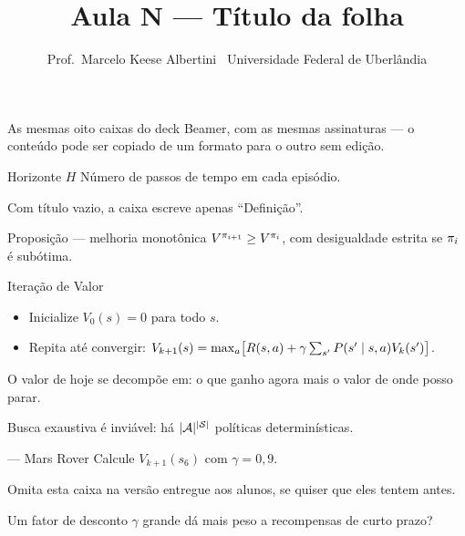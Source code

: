 \documentclass[a4paper, 11pt]{extarticle}
\title{Aula N — Título da folha}
\author{Prof.\ Marcelo Keese Albertini \textbullet\ Universidade Federal de Uberlândia}
\begin{document}
\cabecalho


As mesmas oito caixas do deck Beamer, com as mesmas assinaturas — o
conteúdo pode ser copiado de um formato para o outro sem edição.

\begin{defbox}{Horizonte $H$}
  Número de passos de tempo em cada episódio.
\end{defbox}

\begin{defbox}{}
  Com título vazio, a caixa escreve apenas ``Definição''.
\end{defbox}

\begin{teobox}{Proposição — melhoria monotônica}
  $V^{\pi_{i+1}} \ge V^{\pi_i}$, com desigualdade estrita se $\pi_i$ é subótima.
\end{teobox}

\begin{algbox}{Iteração de Valor}
  \begin{itemize}
    \item Inicialize $V_0(s) = 0$ para todo $s$.
    \item Repita até convergir:
      $V_{k+1}(s) = \max_a\bigl[R(s,a) + \gamma\sum_{s'}P(s'\mid s,a)V_k(s')\bigr]$.
  \end{itemize}
\end{algbox}

\begin{ideiabox}
  O valor de hoje se decompõe em: o que ganho agora mais o valor de onde posso parar.
\end{ideiabox}

\begin{alertabox}
  Busca exaustiva é inviável: há $\lvert\mathcal{A}\rvert^{\lvert\mathcal{S}\rvert}$ políticas determinísticas.
\end{alertabox}

\begin{exbox}{— Mars Rover}
  Calcule $V_{k+1}(s_6)$ com $\gamma = 0{,}9$.
\end{exbox}

\begin{respbox}
  Omita esta caixa na versão entregue aos alunos, se quiser que eles tentem antes.
\end{respbox}

\begin{quizbox}{}
  Um fator de desconto $\gamma$ grande dá mais peso a recompensas de curto prazo?
\end{quizbox}
\paradiscussao
\end{document}
